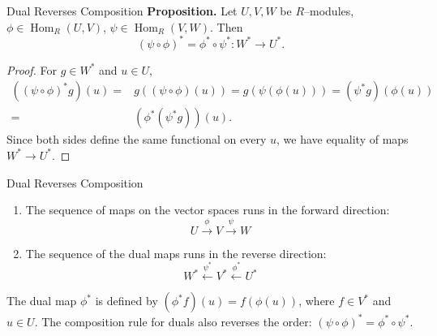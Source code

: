 \begin{frame}{Dual Reverses Composition}
\textbf{Proposition.} Let $U,V,W$ be $R$–modules, $\phi\in\operatorname{Hom}_R(U,V)$, $\psi\in\operatorname{Hom}_R(V,W)$. Then
\[
(\psi\circ \phi)^*=\phi^*\circ \psi^* : W^*\to U^*.
\]

\begin{proof}
For $g\in W^*$ and $u\in U$,
\begin{align*}
    \left((\psi\circ \phi)^* g\right)(u)=&g\left((\psi\circ \phi)(u)\right)=g\left(\psi(\phi(u))\right)=(\psi^* g)\left(\phi(u)\right)\\
=&(\phi^*(\psi^* g))(u).
\end{align*}
Since both sides define the same functional on every $u$, we have equality of maps $W^*\to U^*$.
\end{proof}

\end{frame}

\begin{frame}{Dual Reverses Composition}
\begin{block}{}
\begin{enumerate}
    \item The sequence of maps on the vector spaces runs in the forward direction:
    $$ U \xrightarrow{\phi} V \xrightarrow{\psi} W $$
    \item The sequence of the dual maps runs in the reverse direction:
    $$ W^* \xleftarrow{\psi^*} V^* \xleftarrow{\phi^*} U^* $$
\end{enumerate}
The dual map $\phi^*$ is defined by $(\phi^* f)(u) = f(\phi(u))$, where $f \in V^*$ and $u \in U$. The composition rule for duals also reverses the order: $(\psi \circ \phi)^* = \phi^* \circ \psi^*$.


\end{block}

\end{frame}

